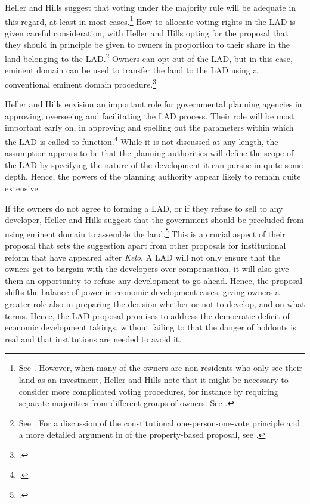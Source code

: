 Heller and Hills suggest that voting under the majority rule will be adequate in this regard, at least in most cases.\footnote{See \cite[1496]{heller08}. However, when many of the owners are non-residents who only see their land as an investment, Heller and Hills note that it might be necessary to consider more complicated voting procedures, for instance by requiring separate majorities from different groups of owners. See \cite[1523-1524]{heller08}.} How to allocate voting rights in the LAD is given careful consideration, with Heller and Hills opting for the proposal that they should in principle be given to owners in proportion to their share in the land belonging to the LAD.\footnote{See \cite[1492]{heller08}. For a discussion of the constitutional one-person-one-vote principle and a more detailed argument in  of the property-based proposal, see \cite[1503-1507]{heller08}.} Owners can opt out of the LAD, but in this case, eminent domain can be used to transfer the land to the LAD using a conventional eminent domain procedure.\footcite[1496]{heller08}

Heller and Hills envision an important role for governmental planning agencies in approving, overseeing and facilitating the LAD process. Their role will be most important early on, in approving and spelling out the parameters within which the LAD is called to function.\footcite[1489-1491]{heller08} While it is not discussed at any length, the assumption appears to be that the planning authorities will define the scope of the LAD by specifying the nature of the development it can pursue in quite some depth. Hence, the powers of the planning authority appear likely to remain quite extensive.

If the owners do not agree to forming a LAD, or if they refuse to sell to any developer, Heller and Hills suggest that the government should be precluded from using eminent domain to assemble the land.\footcite[1491]{heller08} This is a crucial aspect of their proposal that sets the suggestion apart from other proposals for institutional reform that have appeared after {\it Kelo}. A LAD will not only ensure that the owners get to bargain with the developers over compensation, it will also give them an opportunity to refuse any development to go ahead. Hence, the proposal shifts the balance of power in economic development cases, giving owners a greater role also in preparing the decision whether or not to develop, and on what terms. Hence, the LAD proposal promises to address the democratic deficit of economic development takings, without failing to  that the danger of holdouts is real and that institutions are needed to avoid it.


